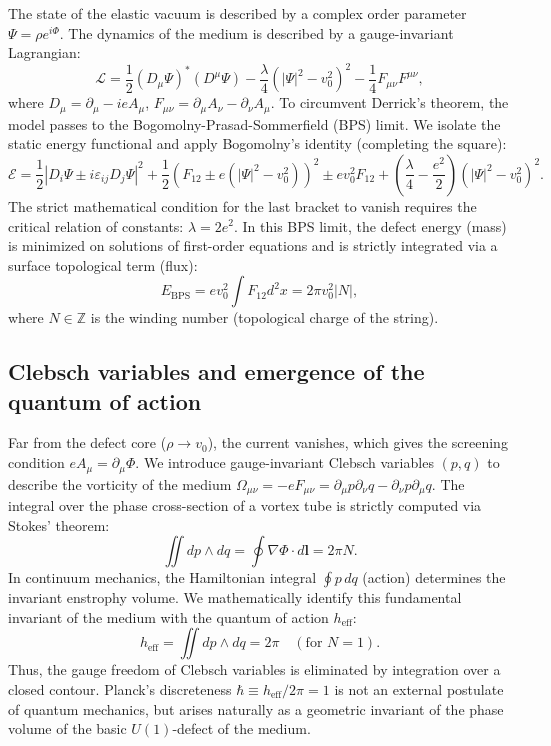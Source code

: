 \documentclass[11pt,a4paper]{article}
\begin{document}
The state of the elastic vacuum is described by a complex order parameter $\Psi = \rho e^{i\Phi}$. The dynamics of the medium is described by a gauge-invariant Lagrangian:
\begin{equation}
\mathcal{L} = \frac{1}{2} (D_\mu \Psi)^* (D^\mu \Psi) - \frac{\lambda}{4} (|\Psi|^2 - v_0^2)^2 - \frac{1}{4} F_{\mu\nu} F^{\mu\nu},
\label{eq:lagrangian}
\end{equation}
where $D_\mu = \partial_\mu - i e A_\mu$, $F_{\mu\nu} = \partial_\mu A_\nu - \partial_\nu A_\mu$. 
To circumvent Derrick's theorem, the model passes to the Bogomolny-Prasad-Sommerfield (BPS) limit. We isolate the static energy functional and apply Bogomolny's identity (completing the square):
\begin{equation}
\mathcal{E} = \frac{1}{2} |D_i \Psi \pm i \varepsilon_{ij} D_j \Psi|^2 + \frac{1}{2} \left(F_{12} \pm e(|\Psi|^2 - v_0^2)\right)^2 \pm e v_0^2 F_{12} + \left(\frac{\lambda}{4} - \frac{e^2}{2}\right) (|\Psi|^2 - v_0^2)^2.
\end{equation}
The strict mathematical condition for the last bracket to vanish requires the critical relation of constants: $\lambda = 2e^2$. In this BPS limit, the defect energy (mass) is minimized on solutions of first-order equations and is strictly integrated via a surface topological term (flux):
\begin{equation}
E_{\text{BPS}} = e v_0^2 \int F_{12} d^2x = 2\pi v_0^2 |N|,
\end{equation}
where $N \in \mathbb{Z}$ is the winding number (topological charge of the string).

\subsection{Clebsch variables and emergence of the quantum of action}
Far from the defect core ($\rho \to v_0$), the current vanishes, which gives the screening condition $e A_\mu = \partial_\mu \Phi$. We introduce gauge-invariant Clebsch variables $(p, q)$ to describe the vorticity of the medium $\Omega_{\mu\nu} = -e F_{\mu\nu} = \partial_\mu p \partial_\nu q - \partial_\nu p \partial_\mu q$.
The integral over the phase cross-section of a vortex tube is strictly computed via Stokes' theorem:
\begin{equation}
\iint dp \wedge dq = \oint \nabla \Phi \cdot d\mathbf{l} = 2\pi N.
\end{equation}
In continuum mechanics, the Hamiltonian integral $\oint p \, dq$ (action) determines the invariant enstrophy volume. We mathematically identify this fundamental invariant of the medium with the quantum of action $h_{\text{eff}}$:
\begin{equation}
h_{\text{eff}} = \iint dp \wedge dq = 2\pi \quad (\text{for } N=1).
\end{equation}
Thus, the gauge freedom of Clebsch variables is eliminated by integration over a closed contour. Planck's discreteness $\hbar \equiv h_{\text{eff}}/2\pi = 1$ is not an external postulate of quantum mechanics, but arises naturally as a geometric invariant of the phase volume of the basic $U(1)$-defect of the medium.
	
\end{document}
